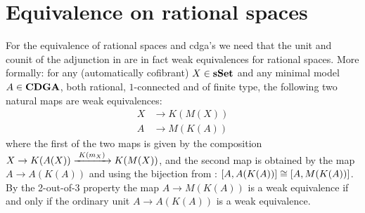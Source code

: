 \section{Equivalence on rational spaces}
For the equivalence of rational spaces and cdga's we need that the unit and counit of the adjunction in  are in fact weak equivalences for rational spaces. More formally: for any (automatically cofibrant) $X \in \mathbf{s{\mathbf{Set}}}$ and any minimal model $A \in \mathbf{CDGA}$, both rational, $1$-connected and of finite type, the following two natural maps are weak equivalences:
\begin{align*}
	X &\to K(M(X)) \\
	A &\to M(K(A))
\end{align*}
where the first of the two maps is given by the composition $X \to K(A(X)) \xrightarrow{\,\,{K(m_X)}\,\,} K(M(X))$,
and the second map is obtained by the map $A \to A(K(A))$ and using the bijection from : $[A, A(K(A))] \cong [A, M(K(A))]$. By the 2-out-of-3 property the map $A \to M(K(A))$ is a weak equivalence if and only if the ordinary unit $A \to A(K(A))$ is a weak equivalence.


